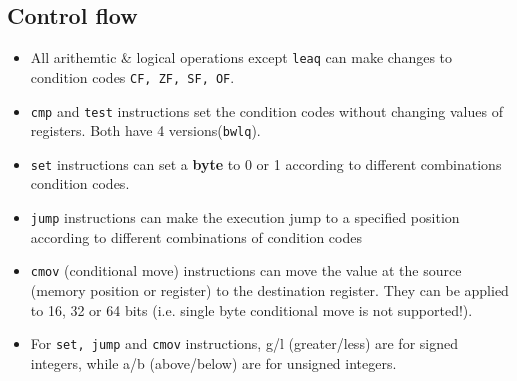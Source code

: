 \subsection{Control flow}
\begin{itemize}
	\item All arithemtic \& logical operations except \texttt{leaq} can make changes to condition codes \texttt{CF, ZF, SF, OF}. 
	\item \texttt{cmp} and \texttt{test} instructions set the condition codes without changing values of registers. Both have 4 versions(\texttt{bwlq}).
	\item \texttt{set} instructions can set a \textbf{byte} to 0 or 1 according to different combinations condition codes.
	\item \texttt{jump} instructions can make the execution jump to a specified position according to different combinations of condition codes
	\item \texttt{cmov} (conditional move) instructions can move the value at the source (memory position or register) to the destination register. They can be applied to 16, 32 or 64 bits (i.e. single byte conditional move is not supported!). 
	\item For \texttt{set, jump} and \texttt{cmov} instructions, g/l (greater/less) are for signed integers, while a/b (above/below) are for unsigned integers.
\end{itemize}

